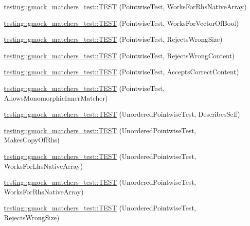 \begin{DoxyCompactItemize}
\item 
\mbox{\hyperlink{namespacetesting_1_1gmock__matchers__test_adabf6a3ceda0024d630d2ece31e37f7c}{testing\+::gmock\+\_\+matchers\+\_\+test\+::\+T\+E\+ST}} (Pointwise\+Test, Works\+For\+Rhs\+Native\+Array)
\item 
\mbox{\hyperlink{namespacetesting_1_1gmock__matchers__test_a9c640ab477c872e25de719b6ed980d7c}{testing\+::gmock\+\_\+matchers\+\_\+test\+::\+T\+E\+ST}} (Pointwise\+Test, Works\+For\+Vector\+Of\+Bool)
\item 
\mbox{\hyperlink{namespacetesting_1_1gmock__matchers__test_a1f73a8fa9dd9560bd606a990444a81fe}{testing\+::gmock\+\_\+matchers\+\_\+test\+::\+T\+E\+ST}} (Pointwise\+Test, Rejects\+Wrong\+Size)
\item 
\mbox{\hyperlink{namespacetesting_1_1gmock__matchers__test_a135ad7162da91c9a234193fbbe5ef775}{testing\+::gmock\+\_\+matchers\+\_\+test\+::\+T\+E\+ST}} (Pointwise\+Test, Rejects\+Wrong\+Content)
\item 
\mbox{\hyperlink{namespacetesting_1_1gmock__matchers__test_a42b98b370f1897cecfafbbfba53f4f38}{testing\+::gmock\+\_\+matchers\+\_\+test\+::\+T\+E\+ST}} (Pointwise\+Test, Accepts\+Correct\+Content)
\item 
\mbox{\hyperlink{namespacetesting_1_1gmock__matchers__test_a9bbef6d651166c37af32c54923bcd849}{testing\+::gmock\+\_\+matchers\+\_\+test\+::\+T\+E\+ST}} (Pointwise\+Test, Allows\+Monomorphic\+Inner\+Matcher)
\item 
\mbox{\hyperlink{namespacetesting_1_1gmock__matchers__test_af3307f88a321331155a146d49974e3e3}{testing\+::gmock\+\_\+matchers\+\_\+test\+::\+T\+E\+ST}} (Unordered\+Pointwise\+Test, Describes\+Self)
\item 
\mbox{\hyperlink{namespacetesting_1_1gmock__matchers__test_a05e9bbee9d19692f45a846c2ff45e016}{testing\+::gmock\+\_\+matchers\+\_\+test\+::\+T\+E\+ST}} (Unordered\+Pointwise\+Test, Makes\+Copy\+Of\+Rhs)
\item 
\mbox{\hyperlink{namespacetesting_1_1gmock__matchers__test_a57e330a5ae600f65d4daa2ed57bbc887}{testing\+::gmock\+\_\+matchers\+\_\+test\+::\+T\+E\+ST}} (Unordered\+Pointwise\+Test, Works\+For\+Lhs\+Native\+Array)
\item 
\mbox{\hyperlink{namespacetesting_1_1gmock__matchers__test_ae75a933b86db4c43a7bec2ffa97692ef}{testing\+::gmock\+\_\+matchers\+\_\+test\+::\+T\+E\+ST}} (Unordered\+Pointwise\+Test, Works\+For\+Rhs\+Native\+Array)
\item 
\mbox{\hyperlink{namespacetesting_1_1gmock__matchers__test_a50412d02c70f8303a087e6832d26ba62}{testing\+::gmock\+\_\+matchers\+\_\+test\+::\+T\+E\+ST}} (Unordered\+Pointwise\+Test, Rejects\+Wrong\+Size)

\end{DoxyCompactItemize}

